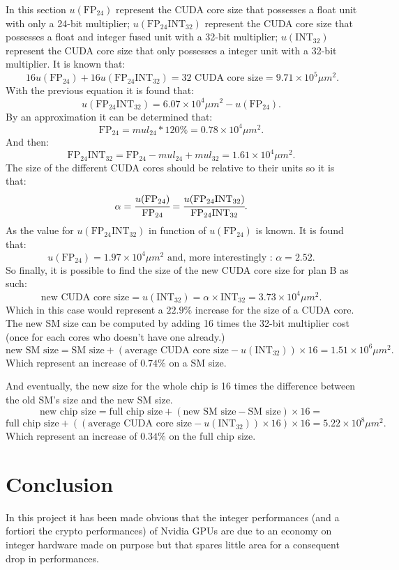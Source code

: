 \documentclass{report}
\begin{document}
   In this section $u(\text{FP}_{24})$ represent the CUDA core size that possesses a float unit with only a 24-bit multiplier; $u(\text{FP}_{24}\text{INT}_{32})$ represent the CUDA core size that possesses a float and integer fused unit with a 32-bit multiplier; $u(\text{INT}_{32})$ represent the CUDA core size that only possesses a integer unit with a 32-bit multiplier.
   It is known that:
   \[\
   16u(\text{FP}_{24}) + 16u(\text{FP}_{24}\text{INT}_{32}) = \text{32 CUDA core size} = 9.71 \times 10^5 \mu m^2. \]
   With the previous equation it is found that:
   \[u(\text{FP}_{24}\text{INT}_{32})  =  6.07 \times 10^4 \mu m^2 - u(\text{FP}_{24}).\]
   By an approximation it can be determined that: \[\text{FP}_{24} = mul_{24} * 120\% = 0.78 \times 10^4  \mu m^2.\]
   And then: \[\text{FP}_{24}\text{INT}_{32} = \text{FP}_{24} - mul_{24} + mul_{32} = 1.61 \times 10^4 \mu m^2.\]
   The size of the different CUDA cores should be relative to their units so it is that:
   \[\alpha = \cfrac{u(\text{FP}_{24})}{\text{FP}_{24}} = \cfrac{u(\text{FP}_{24}\text{INT}_{32})}{\text{FP}_{24}\text{INT}_{32}}.\]
   As the value for $u(\text{FP}_{24}\text{INT}_{32})$ in function of $u(\text{FP}_{24})$ is known. It is found that:
   \[ u(\text{FP}_{24}) = 1.97 \times 10^4 \mu m^2 \text{ and, more interestingly : } \alpha = 2.52.\]
   So finally, it is possible to find the size of the new CUDA core size for plan B as such:
   \[ \text{new CUDA core size} = u(\text{INT}_{32}) = \alpha \times \text{INT}_{32} = 3.73 \times 10^4 \mu m^2.\]
   Which in this case would represent a $22.9\%$ increase for the size of a CUDA core.
   The new SM size can be computed by adding 16 times the 32-bit multiplier cost (once for each cores who doesn't have one already.)
    \[\text{new SM size} = \text{SM size} + (\text{average CUDA core size} - u(\text{INT}_{32})) \times 16 = 1.51 \times 10^6 \mu m^2. \]
    Which represent an increase of $0.74\%$ on a SM size.
    
    And eventually, the new size for the whole chip is 16 times the difference between the old SM's size and the new SM size.
    \[\text{new chip size} = \text{full chip size} + (\text{new SM size} - \text{SM size}) \times 16 =\]
    \[\text{full chip size} + ((\text{average CUDA core size} - u(\text{INT}_{32})) \times 16) \times  16 = 5.22 \times 10^8 \mu m^2. \]
    Which represent an increase of $0.34\%$ on the full chip size.
   
\chapter{Conclusion}
    In this project it has been made obvious that the integer performances 
    (and a fortiori the crypto performances) of Nvidia GPUs are due to an 
    economy on integer hardware made on purpose but that spares little area 
    for a consequent drop in performances. 
    
\end{document}
